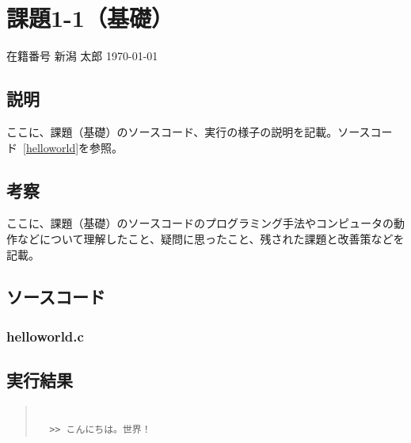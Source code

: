\documentclass[a4paper,12pt,uplatex]{jsarticle}
\newcommand{\mynumber}{在籍番号} %
\newcommand{\myname}{新潟 太郎} %
\newcommand{\myheader}{ %
\begin{flushright}
\mynumber\hspace{1zw} \myname\hspace{1zw} \today\end{flushright}}
\begin{document}

\section*{課題1-1（基礎）}

\myheader

\subsection*{説明}



ここに、課題（基礎）のソースコード、実行の様子の説明を記載。ソースコード~\ref{helloworld}を参照。



\subsection*{考察}



ここに、課題（基礎）のソースコードのプログラミング手法やコンピュータの動作などについて理解したこと、疑問に思ったこと、残された課題と改善策などを記載。



\subsection*{ソースコード}



\subsubsection*{helloworld.c}



\subsection*{実行結果}

\begin{quote}

\begin{verbatim}

  >> こんにちは。世界！

\end{verbatim}

\end{quote}
\end{document}
